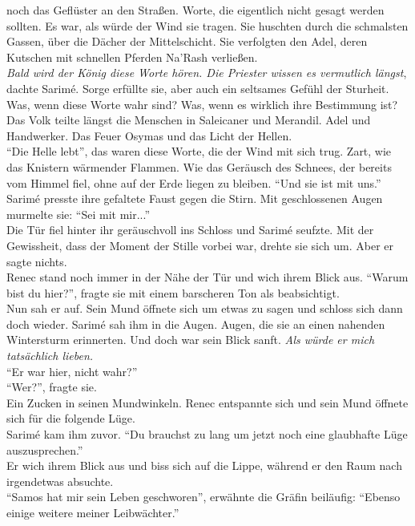 noch das Geflüster an den Straßen. Worte, die eigentlich nicht gesagt werden sollten. Es war, als 
würde der Wind sie tragen. Sie huschten durch die schmalsten Gassen, über die Dächer der 
Mittelschicht. Sie verfolgten den Adel, deren Kutschen mit schnellen Pferden Na'Rash verließen.\\
\textit{Bald wird der König diese Worte hören. Die Priester wissen es vermutlich längst}, dachte 
Sarimé. Sorge erfüllte sie, aber auch ein seltsames Gefühl der Sturheit. Was, wenn diese Worte wahr 
sind? Was, wenn es wirklich ihre Bestimmung ist?\\
Das Volk teilte längst die Menschen in Saleicaner und Merandil. Adel und Handwerker. Das Feuer 
Osymas und das Licht der Hellen.\\
``Die Helle lebt'', das waren diese Worte, die der Wind mit sich trug. Zart, wie das Knistern 
wärmender Flammen. Wie das Geräusch des Schnees, der bereits vom Himmel fiel, ohne auf der 
Erde liegen zu bleiben. ``Und sie ist mit uns.''\\
Sarimé presste ihre gefaltete Faust gegen die Stirn. Mit geschlossenen Augen murmelte sie: ``Sei 
mit mir...''\\
Die Tür fiel hinter ihr geräuschvoll ins Schloss und Sarimé seufzte. Mit der Gewissheit, dass der 
Moment der Stille vorbei war, drehte sie sich um. Aber er sagte nichts.\\
Renec stand noch immer in der Nähe der Tür und wich ihrem Blick aus. ``Warum bist du hier?'', 
fragte sie mit einem barscheren Ton als beabsichtigt.\\
Nun sah er auf. Sein Mund öffnete sich um etwas zu sagen und schloss sich dann doch wieder. 
Sarimé sah ihm in die Augen. Augen, die sie an einen nahenden Wintersturm erinnerten. Und doch war 
sein Blick sanft. \textit{Als würde er mich tatsächlich lieben.}\\
``Er war hier, nicht wahr?''\\
``Wer?'', fragte sie.\\
Ein Zucken in seinen Mundwinkeln. Renec entspannte sich und sein Mund öffnete sich für die folgende 
Lüge.\\
Sarimé kam ihm zuvor. ``Du brauchst zu lang um jetzt noch eine glaubhafte Lüge auszusprechen.''\\
Er wich ihrem Blick aus und biss sich auf die Lippe, während er den Raum nach irgendetwas 
absuchte.\\
``Samos hat mir sein Leben geschworen'', erwähnte die Gräfin beiläufig: ``Ebenso einige weitere 
meiner Leibwächter.''\\
